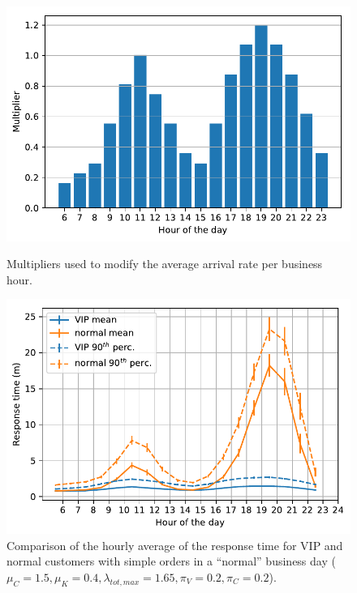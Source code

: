 \begin{figure}[H]
  \begin{minipage}{0.48\textwidth}
    \centering
    \includegraphics[width=\textwidth]{figs/business_day/input_bd.pdf}
    \caption{Multipliers used to modify the average arrival rate per business hour.}
    \label{fig:bd:mul}
  \end{minipage}\hspace{0.03\textwidth}
  \begin{minipage}{0.48\textwidth}
    \centering
    \includegraphics[width=\textwidth]{figs/business_day/vip_vs_normal_simple.pdf}
    \caption{Comparison of the hourly average of the response time for VIP and normal customers with simple orders in a ``normal'' business day ($\mu_C=1.5, \mu_K=0.4, \lambda_{tot,max} = 1.65, \pi_V=0.2, \pi_C=0.2$).}
    \label{fig:bd:vip_vs_norm}
  \end{minipage}
\end{figure}

